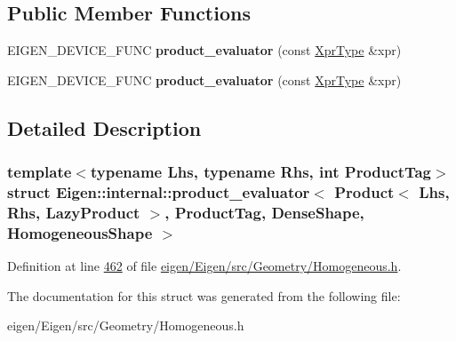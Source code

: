 \subsection*{Public Member Functions}
\begin{DoxyCompactItemize}
\item 
\mbox{\label{struct_eigen_1_1internal_1_1product__evaluator_3_01_product_3_01_lhs_00_01_rhs_00_01_lazy_producdc5bcb3d77429f754f91ead5635235a9_aeac49da391f46a225196a8efca7c09ca}} 
E\+I\+G\+E\+N\+\_\+\+D\+E\+V\+I\+C\+E\+\_\+\+F\+U\+NC {\bfseries product\+\_\+evaluator} (const \hyperlink{group___core___module_class_eigen_1_1_product}{Xpr\+Type} \&xpr)
\item 
\mbox{\label{struct_eigen_1_1internal_1_1product__evaluator_3_01_product_3_01_lhs_00_01_rhs_00_01_lazy_producdc5bcb3d77429f754f91ead5635235a9_aeac49da391f46a225196a8efca7c09ca}} 
E\+I\+G\+E\+N\+\_\+\+D\+E\+V\+I\+C\+E\+\_\+\+F\+U\+NC {\bfseries product\+\_\+evaluator} (const \hyperlink{group___core___module_class_eigen_1_1_product}{Xpr\+Type} \&xpr)
\end{DoxyCompactItemize}


\subsection{Detailed Description}
\subsubsection*{template$<$typename Lhs, typename Rhs, int Product\+Tag$>$\newline
struct Eigen\+::internal\+::product\+\_\+evaluator$<$ Product$<$ Lhs, Rhs, Lazy\+Product $>$, Product\+Tag, Dense\+Shape, Homogeneous\+Shape $>$}



Definition at line \hyperlink{eigen_2_eigen_2src_2_geometry_2_homogeneous_8h_source_l00462}{462} of file \hyperlink{eigen_2_eigen_2src_2_geometry_2_homogeneous_8h_source}{eigen/\+Eigen/src/\+Geometry/\+Homogeneous.\+h}.



The documentation for this struct was generated from the following file\+:\begin{DoxyCompactItemize}
\item 
eigen/\+Eigen/src/\+Geometry/\+Homogeneous.\+h\end{DoxyCompactItemize}
